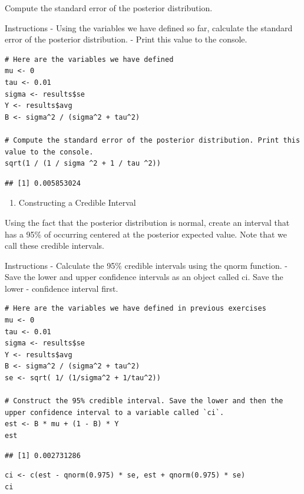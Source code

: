 \documentclass[
]{article}
\providecommand{\tightlist}{%
  \setlength{\itemsep}{0pt}\setlength{\parskip}{0pt}}
\begin{document}
Compute the standard error of the posterior distribution.

Instructions - Using the variables we have defined so far, calculate the
standard error of the posterior distribution. - Print this value to the
console.

\begin{verbatim}
# Here are the variables we have defined
mu <- 0
tau <- 0.01
sigma <- results$se
Y <- results$avg
B <- sigma^2 / (sigma^2 + tau^2)

# Compute the standard error of the posterior distribution. Print this value to the console.
sqrt(1 / (1 / sigma ^2 + 1 / tau ^2))
\end{verbatim}

\begin{verbatim}
## [1] 0.005853024
\end{verbatim}

\begin{enumerate}
\def\labelenumi{\arabic{enumi}.}
\setcounter{enumi}{9}
\tightlist
\item
  Constructing a Credible Interval
\end{enumerate}

Using the fact that the posterior distribution is normal, create an
interval that has a 95\% of occurring centered at the posterior expected
value. Note that we call these credible intervals.

Instructions - Calculate the 95\% credible intervals using the qnorm
function. - Save the lower and upper confidence intervals as an object
called ci. Save the lower - confidence interval first.

\begin{verbatim}
# Here are the variables we have defined in previous exercises
mu <- 0
tau <- 0.01
sigma <- results$se
Y <- results$avg
B <- sigma^2 / (sigma^2 + tau^2)
se <- sqrt( 1/ (1/sigma^2 + 1/tau^2))

# Construct the 95% credible interval. Save the lower and then the upper confidence interval to a variable called `ci`.
est <- B * mu + (1 - B) * Y
est
\end{verbatim}

\begin{verbatim}
## [1] 0.002731286
\end{verbatim}

\begin{verbatim}
ci <- c(est - qnorm(0.975) * se, est + qnorm(0.975) * se)
ci
\end{verbatim}
\end{document}
